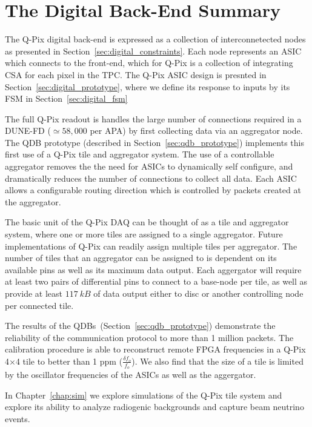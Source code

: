 \section{The Digital Back-End Summary}

The Q-Pix digital back-end is expressed as a collection of interconnetected nodes as presented in Section~\ref{sec:digital_constraints}.
Each node represents an ASIC which connects to the front-end, which for Q-Pix is a collection of integrating CSA for each pixel in the TPC.
The Q-Pix ASIC design is presnted in Section~\ref{sec:digital_prototype}, where we define its response to inputs by its FSM in Section~\ref{sec:digital_fsm}

The full Q-Pix readout is handles the large number of connections required in a DUNE-FD ($\simeq 58,000$ per APA) by first collecting data via an aggregator node.
The QDB prototype (described in Section~\ref{sec:qdb_prototype}) implements this first use of a Q-Pix tile and aggregator system.
The use of a controllable aggregator removes the the need for ASICs to dynamically self configure, and dramatically reduces the number of connections to collect all data.
Each ASIC allows a configurable routing direction which is controlled by packets created at the aggregator.

The basic unit of the Q-Pix DAQ can be thought of as a tile and aggregator system, where one or more tiles are assigned to a single aggregator.
Future implementations of Q-Pix can readily assign multiple tiles per aggregator.
The number of tiles that an aggregator can be assigned to is dependent on its available pins as well as its maximum data output.
Each aggergator will require at least two pairs of differential pins to connect to a base-node per tile, as well as provide at least $117~\unit{kB}$ of data output either to disc or another controlling node per connected tile.

The results of the QDBs~(Section~\ref{sec:qdb_prototype}) demonstrate the reliability of the communication protocol to more than 1 million packets.
The calibration procedure is able to reconstruct remote FPGA frequencies in a Q-Pix 4$\times$4 tile to better than 1 ppm ($\frac{\delta f_{o}}{f_{o}}$).
We also find that the size of a tile is limited by the oscillator frequencies of the ASICs as well as the aggergator.

In Chapter~\ref{chap:sim} we explore simulations of the Q-Pix tile system and explore its ability to analyze radiogenic backgrounds and capture beam neutrino events.




